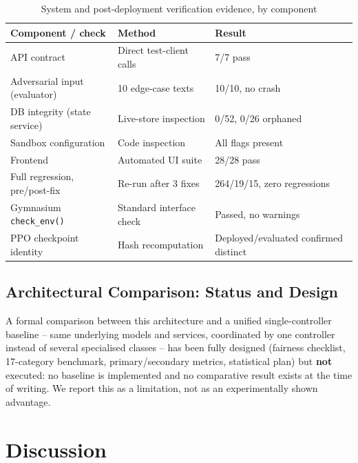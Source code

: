 \documentclass[runningheads]{llncs}
\begin{document}
\begin{table}[t]
\centering
\caption{System and post-deployment verification evidence, by component}
\label{tab:testing}
\small
\begin{tabular}{p{3.9cm}p{4.3cm}p{3.1cm}}
\toprule
\textbf{Component / check} & \textbf{Method} & \textbf{Result} \\
\midrule
API contract & Direct test-client calls & 7/7 pass \\
Adversarial input (evaluator) & 10 edge-case texts & 10/10, no crash \\
DB integrity (state service) & Live-store inspection & 0/52, 0/26 orphaned \\
Sandbox configuration & Code inspection & All flags present \\
Frontend & Automated UI suite & 28/28 pass \\
Full regression, pre/post-fix & Re-run after 3 fixes & 264/19/15, zero regressions \\
Gymnasium \texttt{check\_env()} & Standard interface check & Passed, no warnings \\
PPO checkpoint identity & Hash recomputation & Deployed/evaluated confirmed distinct \\
\bottomrule
\end{tabular}
\end{table}

\subsection{Architectural Comparison: Status and Design}
\label{sec:future-comparison}

A formal comparison between this architecture and a unified single-controller baseline -- same underlying models and services, coordinated by one controller instead of several specialised classes -- has been fully designed (fairness checklist, 17-category benchmark, primary/secondary metrics, statistical plan) but \textbf{not} executed: no baseline is implemented and no comparative result exists at the time of writing. We report this as a limitation, not as an experimentally shown advantage.

\section{Discussion}
\label{sec:discussion}
\end{document}
